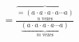 \documentclass[preview]{standalone}
\begin{document}
\begin{align*}
=\frac{\overbrace{=(a \cdot a \cdot a \cdot a \cdots a)}_{n \text{ vezes}}}{ \underbrace{(a \cdot a \cdot a \cdot a \cdots a)}_{m \text{ vezes}}}
\end{align*}
\end{document}
